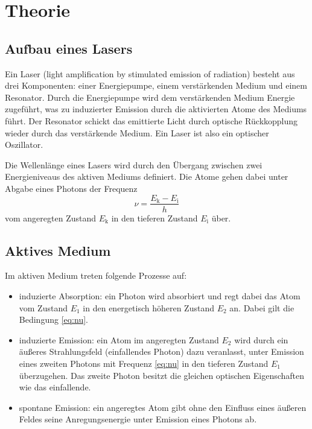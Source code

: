 \section{Theorie}
\label{sec:Theorie}

\subsection{Aufbau eines Lasers}
Ein Laser (light amplification by stimulated emission of radiation) besteht aus drei Komponenten: einer Energiepumpe, einem verstärkenden Medium und einem Resonator.
Durch die Energiepumpe wird dem verstärkenden Medium Energie zugeführt, was zu induzierter Emission durch die aktivierten Atome des Mediums führt. Der Resonator schickt das emittierte Licht durch optische Rückkopplung wieder durch das verstärkende Medium. Ein Laser ist also ein optischer Oszillator.

Die Wellenlänge eines Lasers wird durch den Übergang zwischen zwei Energieniveaus des aktiven Mediums definiert. Die Atome gehen dabei unter Abgabe eines Photons der Frequenz
\begin{equation}
    \nu = \frac{E_\text{k} - E_\text{i}}{h}
    \label{eq:nu}
\end{equation}
vom angeregten Zustand $E_\text{k}$ in den tieferen Zustand $E_\text{i}$ über.

\subsection{Aktives Medium}
Im aktiven Medium treten folgende Prozesse auf:
\begin{itemize}
    \item induzierte Absorption: ein Photon wird absorbiert und regt dabei das Atom vom Zustand $E_1$ in den energetisch höheren Zustand $E_2$ an. Dabei gilt die Bedingung \eqref{eq:nu}.
    \item induzierte Emission: ein Atom im angeregten Zustand $E_2$ wird durch ein äußeres Strahlungsfeld (einfallendes Photon) dazu veranlasst, unter Emission eines zweiten Photons mit Frequenz \eqref{eq:nu} in den tieferen Zustand $E_1$ überzugehen. Das zweite Photon besitzt die gleichen optischen Eigenschaften wie das einfallende.
    \item spontane Emission: ein angeregtes Atom gibt ohne den Einfluss eines äußeren Feldes seine Anregungsenergie unter Emission eines Photons ab.
\end{itemize}

